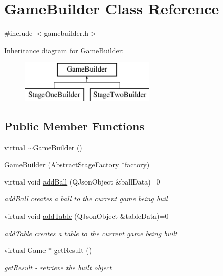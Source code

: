 \hypertarget{class_game_builder}{}\section{Game\+Builder Class Reference}
\label{class_game_builder}


{\ttfamily \#include $<$gamebuilder.\+h$>$}

Inheritance diagram for Game\+Builder\+:\begin{figure}[H]
\begin{center}
\leavevmode
\includegraphics[height=2.000000cm]{class_game_builder}
\end{center}
\end{figure}
\subsection*{Public Member Functions}
\begin{DoxyCompactItemize}
\item 
virtual \mbox{\hyperlink{class_game_builder_ad817a2588d910c2798dfb27808c29d48}{$\sim$\+Game\+Builder}} ()
\item 
\mbox{\hyperlink{class_game_builder_a1540d75dc9f7beb42a95bbc083f86ae1}{Game\+Builder}} (\mbox{\hyperlink{class_abstract_stage_factory}{Abstract\+Stage\+Factory}} $\ast$factory)
\item 
virtual void \mbox{\hyperlink{class_game_builder_a836186637bd2f7844f7dfac0135d833b}{add\+Ball}} (Q\+Json\+Object \&ball\+Data)=0
\begin{DoxyCompactList}\small\item\em add\+Ball creates a ball to the current game being buil \end{DoxyCompactList}\item 
virtual void \mbox{\hyperlink{class_game_builder_a65fb629009c18956a8d592352eda1eb5}{add\+Table}} (Q\+Json\+Object \&table\+Data)=0
\begin{DoxyCompactList}\small\item\em add\+Table creates a table to the current game being built \end{DoxyCompactList}\item 
virtual \mbox{\hyperlink{class_game}{Game}} $\ast$ \mbox{\hyperlink{class_game_builder_a490e3dbb7f8289edb2a080a3383f8607}{get\+Result}} ()
\begin{DoxyCompactList}\small\item\em get\+Result -\/ retrieve the built object \end{DoxyCompactList}\end{DoxyCompactItemize}
